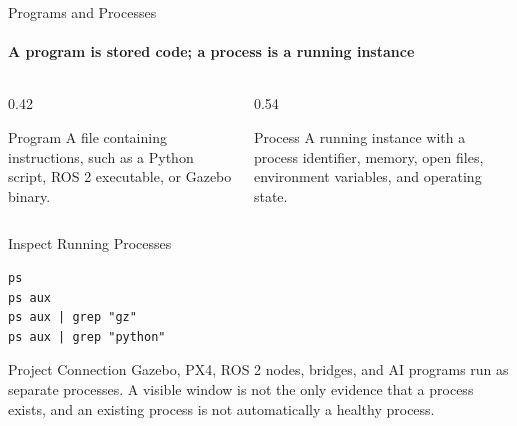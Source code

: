 \begin{frame}[fragile]{Programs and Processes}
\framesubtitle{A program is stored code; a process is a running instance}

\footnotesize

\begin{columns}[T,onlytextwidth]
    \begin{column}{0.42\textwidth}
        \begin{block}{Program}
            A file containing instructions, such as a Python script, ROS 2
            executable, or Gazebo binary.
        \end{block}
    \end{column}

    \begin{column}{0.54\textwidth}
        \begin{exampleblock}{Process}
            A running instance with a process identifier, memory, open files,
            environment variables, and operating state.
        \end{exampleblock}
    \end{column}
\end{columns}

\begin{block}{Inspect Running Processes}
\begin{verbatim}
ps
ps aux
ps aux | grep "gz"
ps aux | grep "python"
\end{verbatim}
\end{block}

\begin{alertblock}{Project Connection}
Gazebo, PX4, ROS 2 nodes, bridges, and AI programs run as separate processes.
A visible window is not the only evidence that a process exists, and an existing
process is not automatically a healthy process.
\end{alertblock}
\end{frame}

